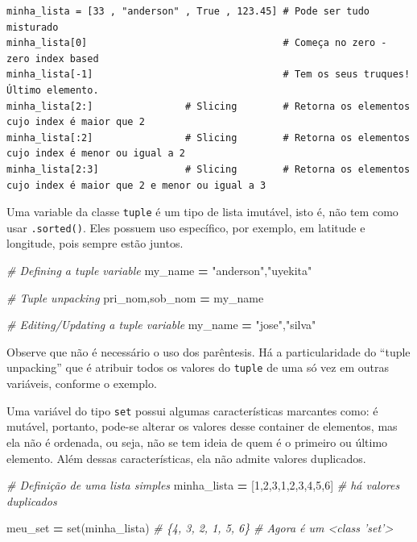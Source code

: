 \documentclass[]{book}
\newenvironment{Shaded}{\begin{snugshade}}{\end{snugshade}}
\newcommand{\DecValTok}[1]{\textcolor[rgb]{0.00,0.00,0.81}{#1}}
\newcommand{\StringTok}[1]{\textcolor[rgb]{0.31,0.60,0.02}{#1}}
\newcommand{\CommentTok}[1]{\textcolor[rgb]{0.56,0.35,0.01}{\textit{#1}}}
\newcommand{\OperatorTok}[1]{\textcolor[rgb]{0.81,0.36,0.00}{\textbf{#1}}}
\newcommand{\BuiltInTok}[1]{#1}
\newcommand{\NormalTok}[1]{#1}
\begin{document}
\begin{verbatim}
minha_lista = [33 , "anderson" , True , 123.45] # Pode ser tudo misturado
minha_lista[0]                                  # Começa no zero - zero index based
minha_lista[-1]                                 # Tem os seus truques! Último elemento.
minha_lista[2:]                # Slicing        # Retorna os elementos cujo index é maior que 2
minha_lista[:2]                # Slicing        # Retorna os elementos cujo index é menor ou igual a 2
minha_lista[2:3]               # Slicing        # Retorna os elementos cujo index é maior que 2 e menor ou igual a 3
\end{verbatim}

Uma variable da classe \texttt{tuple} é um tipo de lista imutável, isto
é, não tem como usar \texttt{.sorted()}. Eles possuem uso específico,
por exemplo, em latitude e longitude, pois sempre estão juntos.

\begin{Shaded}
\begin{Highlighting}[]
\CommentTok{# Defining a tuple variable}
\NormalTok{my_name }\OperatorTok{=} \StringTok{"anderson"}\NormalTok{,}\StringTok{"uyekita"}

\CommentTok{# Tuple unpacking}
\NormalTok{pri_nom,sob_nom }\OperatorTok{=}\NormalTok{ my_name}

\CommentTok{# Editing/Updating a tuple variable}
\NormalTok{my_name }\OperatorTok{=} \StringTok{"jose"}\NormalTok{,}\StringTok{"silva"}
\end{Highlighting}
\end{Shaded}

Observe que não é necessário o uso dos parêntesis. Há a particularidade
do ``tuple unpacking'' que é atribuir todos os valores do \texttt{tuple}
de uma só vez em outras variáveis, conforme o exemplo.

Uma variável do tipo \texttt{set} possui algumas características
marcantes como: é mutável, portanto, pode-se alterar os valores desse
container de elementos, mas ela não é ordenada, ou seja, não se tem
ideia de quem é o primeiro ou último elemento. Além dessas
características, ela não admite valores duplicados.

\begin{Shaded}
\begin{Highlighting}[]
\CommentTok{# Definição de uma lista simples}
\NormalTok{minha_lista }\OperatorTok{=}\NormalTok{ [}\DecValTok{1}\NormalTok{,}\DecValTok{2}\NormalTok{,}\DecValTok{3}\NormalTok{,}\DecValTok{1}\NormalTok{,}\DecValTok{2}\NormalTok{,}\DecValTok{3}\NormalTok{,}\DecValTok{4}\NormalTok{,}\DecValTok{5}\NormalTok{,}\DecValTok{6}\NormalTok{] }\CommentTok{# há valores duplicados}

\NormalTok{meu_set }\OperatorTok{=} \BuiltInTok{set}\NormalTok{(minha_lista)        }\CommentTok{# \{4, 3, 2, 1, 5, 6\}}
                                  \CommentTok{# Agora é um <class 'set'>}
\end{Highlighting}
\end{Shaded}
\end{document}
